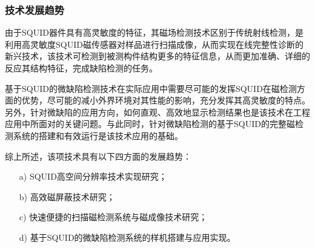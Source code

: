 \documentclass[a4paper,12pt，twoside]{ctexart}
\begin{document}
	\subsubsection{技术发展趋势}
	由于SQUID器件具有高灵敏度的特征，其磁场检测技术区别于传统射线检测，是利用高灵敏度SQUID磁传感器对样品进行扫描成像，从而实现在线完整性诊断的新兴技术，该技术可检测到被测构件结构更多的特征信息，从而更加准确、详细的反应其结构特征，完成缺陷检测的任务。\par
	基于SQUID的微缺陷检测技术在实际应用中需要尽可能的发挥SQUID在磁检测方面的优势，尽可能的减小外界环境对其性能的影响，充分发挥其高灵敏度的特点。另外，针对微缺陷的应用方向，如何直观、高效地显示检测结果也是该技术在工程应用中所面对的关键问题。与此同时，针对微缺陷检测的基于SQUID的完整磁检测系统的搭建和有效运行是该技术应用的基础。\par
	综上所述，该项技术具有以下四方面的发展趋势：
	\begin{enumerate}
		\item[a)] SQUID高空间分辨率技术实现研究；
		\item[b)] 高效磁屏蔽技术研究；
		\item[c)] 快速便捷的扫描磁检测系统与磁成像技术研究；
		\item[d)] 基于SQUID的微缺陷检测系统的样机搭建与应用实现。
	\end{enumerate}
\end{document}

